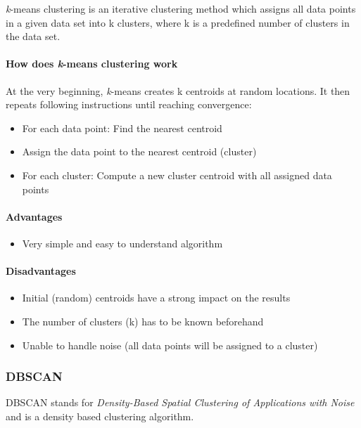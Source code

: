 \textit{k}-means clustering is an iterative clustering method which assigns all data points in a given data set
into k clusters, where k is a predefined number of clusters in the data set.

\paragraph{How does \textit{k}-means clustering work}
At the very beginning, \textit{k}-means creates k centroids at random locations.
It then repeats following instructions until reaching convergence:

\begin{itemize}
    \item For each data point: Find the nearest centroid
    \item Assign the data point to the nearest centroid (cluster)
    \item For each cluster: Compute a new cluster centroid with all assigned data points
\end{itemize}

\paragraph{Advantages}
\begin{itemize}
    \item Very simple and easy to understand algorithm
\end{itemize}

\paragraph{Disadvantages}
\begin{itemize}
    \item Initial (random) centroids have a strong impact on the results
    \item The number of clusters (k) has to be known beforehand
    \item Unable to handle noise (all data points will be assigned to a cluster)
\end{itemize}

\subsubsection{DBSCAN}
\label{subsubsec:3_dbscan}

DBSCAN stands for \textit{Density-Based Spatial Clustering of Applications with Noise}
and is a density based clustering algorithm.

